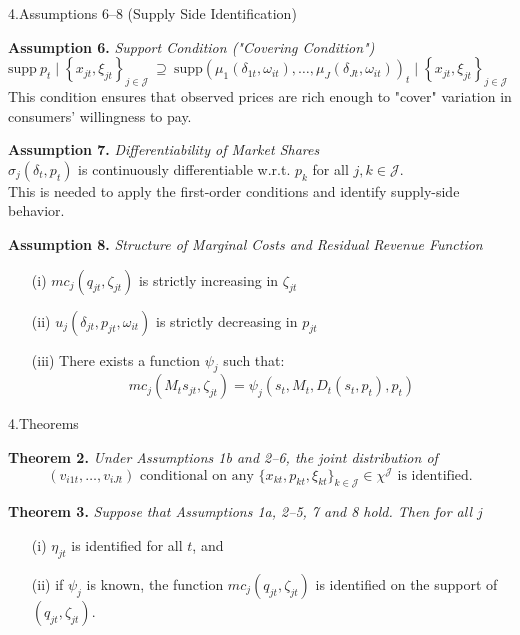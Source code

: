 \documentclass[aspectratio=169]{beamer}  %
\begin{document}
\begin{frame}{4.Assumptions 6--8 (Supply Side Identification)}

\textbf{Assumption 6.} \textit{Support Condition ("Covering Condition")}\\
\smallskip
\quad $\text{supp}\ p_t \mid \left\{x_{jt}, \xi_{jt}\right\}_{j \in \mathcal{J}} \ \supseteq \ \text{supp} \left( \mu_1(\delta_{1t}, \omega_{it}), \ldots, \mu_J(\delta_{Jt}, \omega_{it}) \right)_t \mid \left\{x_{jt}, \xi_{jt} \right\}_{j \in \mathcal{J}}$\\
\smallskip
This condition ensures that observed prices are rich enough to "cover" variation in consumers’ willingness to pay. 

\bigskip
\textbf{Assumption 7.} \textit{Differentiability of Market Shares}\\
\smallskip
\quad $\sigma_j(\delta_t, p_t)$ is continuously differentiable w.r.t. $p_k$ for all $j, k \in \mathcal{J}$.\\
\smallskip
This is needed to apply the first-order conditions and identify supply-side behavior.

\bigskip
\textbf{Assumption 8.} \textit{Structure of Marginal Costs and Residual Revenue Function}\\
\begin{itemize}
    \item[(i)] $mc_j(q_{jt}, \zeta_{jt})$ is strictly increasing in $\zeta_{jt}$
    \item[(ii)] $u_j(\delta_{jt}, p_{jt}, \omega_{it})$ is strictly decreasing in $p_{jt}$
    \item[(iii)] There exists a function $\psi_j$ such that:
    \[
    mc_j(M_t s_{jt}, \zeta_{jt}) = \psi_j(s_t, M_t, D_t(s_t, p_t), p_t)
    \]
\end{itemize}
\end{frame}

\begin{frame}{4.Theorems}

\textbf{Theorem 2.} \textit{Under Assumptions 1b and 2--6, the joint distribution of}
\[ (v_{i1t}, \ldots, v_{iJt}) \text{ conditional on any } \{x_{kt}, p_{kt}, \xi_{kt}\}_{k \in \mathcal{J}} \in \chi^{\mathcal{J}} \text{ is identified.} \]

\vspace{0.5cm}

\textbf{Theorem 3.} \textit{Suppose that Assumptions 1a, 2--5, 7 and 8 hold. Then for all $j$}
\begin{itemize}
    \item[(i)] $\eta_{jt}$ is identified for all $t$, and
    \item[(ii)] if $\psi_j$ is known, the function $mc_j(q_{jt}, \zeta_{jt})$ is identified on the support of $(q_{jt}, \zeta_{jt})$.
\end{itemize}
\end{frame}
\end{document}
